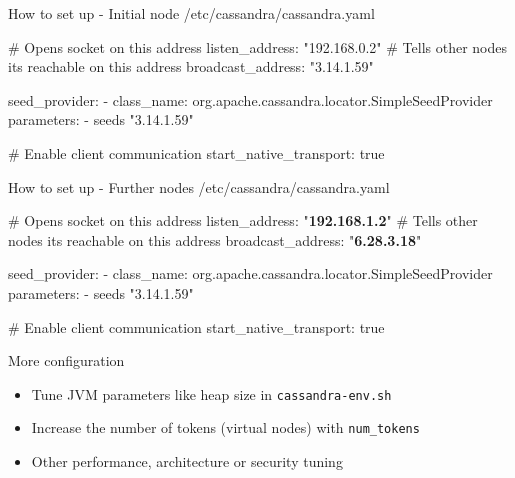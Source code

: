 \documentclass[
  10pt
]{beamer}
\begin{document}
\begin{frame}[fragile]{How to set up - Initial node \cite{cassandra_config}}
  /etc/cassandra/cassandra.yaml
  \begin{semiverbatim}
# Opens socket on this address
listen_address: "192.168.0.2"
# Tells other nodes its reachable on this address
broadcast_address: "3.14.1.59"

seed_provider:
  - class_name: org.apache.cassandra.locator.SimpleSeedProvider
    parameters:
      - seeds "3.14.1.59"

# Enable client communication
start_native_transport: true
  \end{semiverbatim}
\end{frame}

\begin{frame}[fragile]{How to set up - Further nodes \cite{cassandra_config}}
  /etc/cassandra/cassandra.yaml
  \begin{semiverbatim}
# Opens socket on this address
listen_address: "\textbf{192.168.1.2}"
# Tells other nodes its reachable on this address
broadcast_address: "\textbf{6.28.3.18}"

seed_provider:
  - class_name: org.apache.cassandra.locator.SimpleSeedProvider
    parameters:
      - seeds "3.14.1.59"

# Enable client communication
start_native_transport: true
  \end{semiverbatim}
\end{frame}

\begin{frame}{More configuration \cite{cassandra_config, cassandra_jvm_tuning}}
  \begin{itemize}
    \item Tune JVM parameters like heap size in \lstinline{cassandra-env.sh}
    \item Increase the number of tokens (virtual nodes) with \lstinline{num_tokens}
    \item Other performance, architecture or security tuning
  \end{itemize}
\end{frame}

\end{document}
